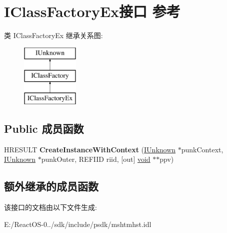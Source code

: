 \hypertarget{interface_i_class_factory_ex}{}\section{I\+Class\+Factory\+Ex接口 参考}
\label{interface_i_class_factory_ex}
类 I\+Class\+Factory\+Ex 继承关系图\+:\begin{figure}[H]
\begin{center}
\leavevmode
\includegraphics[height=3.000000cm]{interface_i_class_factory_ex}
\end{center}
\end{figure}
\subsection*{Public 成员函数}
\begin{DoxyCompactItemize}
\item 
\mbox{\label{interface_i_class_factory_ex_a3e972753fbf0006355786eb4b20f43bf}} 
H\+R\+E\+S\+U\+LT {\bfseries Create\+Instance\+With\+Context} (\hyperlink{interface_i_unknown}{I\+Unknown} $\ast$punk\+Context, \hyperlink{interface_i_unknown}{I\+Unknown} $\ast$punk\+Outer, R\+E\+F\+I\+ID riid, \mbox{[}out\mbox{]} \hyperlink{interfacevoid}{void} $\ast$$\ast$ppv)
\end{DoxyCompactItemize}
\subsection*{额外继承的成员函数}


该接口的文档由以下文件生成\+:\begin{DoxyCompactItemize}
\item 
E\+:/\+React\+O\+S-\/0../sdk/include/psdk/mshtmhst.\+idl\end{DoxyCompactItemize}
